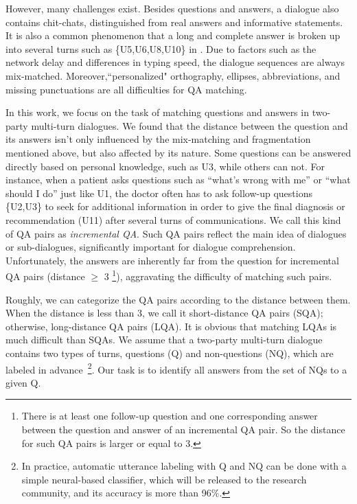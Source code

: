 However, many challenges exist. Besides questions and answers, a dialogue also contains chit-chats, distinguished from real answers and informative statements. It is also a common phenomenon that a long and complete answer is broken up into several turns such as \{U5,U6,U8,U10\} in . Due to factors such as the network delay and differences in typing speed, the dialogue sequences are always mix-matched. Moreover,``personalized" orthography, ellipses, abbreviations, and missing punctuations are all difficulties for QA matching.



In this work, we focus on the task of matching questions and answers in two-party multi-turn dialogues. We found that the distance between the question and its answers isn't only influenced by the mix-matching and fragmentation mentioned above, but also affected by its nature. Some questions can be answered directly based on personal knowledge, such as U3, while others can not. For instance, when a patient asks questions such as ``what's wrong with me'' or ``what should I do'' just like U1, the doctor often has to ask follow-up questions \{U2,U3\} to seek for additional information in order to give the final diagnosis or recommendation (U11) after several turns of communications. We call this kind of QA pairs as {\em incremental QA}. Such QA pairs reflect the main idea of dialogues or sub-dialogues, significantly important for dialogue comprehension. Unfortunately, the answers are inherently far from the question for incremental QA pairs (distance $\geq$ 3 \footnote{There is at least one follow-up question and one corresponding answer between the question and answer of an incremental QA pair. So the distance for such QA pairs is larger or equal to 3.}), aggravating the difficulty of matching such pairs. 

Roughly, we can categorize the QA pairs according to the distance between them. 
When the distance is less than 3, we call it short-distance QA pairs (SQA); 
otherwise, long-distance QA pairs (LQA). 
It is obvious that matching LQAs is much difficult than SQAs. 
We assume that a two-party multi-turn dialogue contains two types of turns, 
questions (Q) and non-questions (NQ), 
which are labeled in advance~\footnote{In practice, automatic utterance labeling with Q and NQ can be done with a simple neural-based classifier, 
which will be released to the research community, 
and its accuracy is more than 96\%.}. 
Our task is to identify all answers from the set of NQs to a given Q. 

